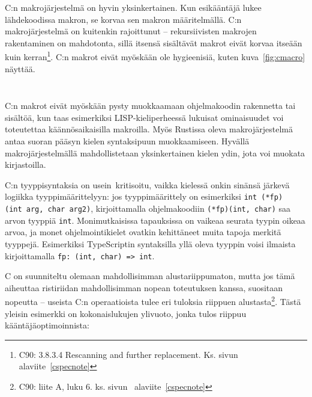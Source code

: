 C:n makrojärjestelmä on hyvin yksinkertainen. Kun esikääntäjä lukee
lähdekoodissa makron, se korvaa sen makron määritelmällä. C:n makrojärjestelmä
on kuitenkin rajoittunut -- rekursiivisten makrojen rakentaminen on mahdotonta,
sillä itsensä sisältävät makrot eivät korvaa itseään kuin kerran\footnote{C90:
3.8.3.4 Rescanning and further replacement. Ks. sivun~\pageref{cspecnote}
alaviite~\ref{cspecnote}}. C:n makrot eivät myöskään ole hygieenisiä, kuten
kuva~\ref{fig:cmacro} näyttää.

\begin{listing}[ht!]
    \inputminted{C}{c-hygiene.c}
    \inputminted{text}{c-hygiene-output.txt}
    \caption{C:n makrot eivät ole hygieenisiä. DOUBLE-makro muuttuu
    käännösvaiheessa muotoon 1+1*2, joka on laskujärjestyksen takia 3 eikä
    odotettu 4. Koko printf-kutsuksi muodostuu siis
    ''\texttt{printf("one plus one doubled is \%d", 1+1*2)}''
    \label{fig:cmacro}
}
\end{listing}

C:n makrot eivät myöskään pysty muokkaamaan ohjelmakoodin rakennetta tai
sisältöä, kun taas esimerkiksi LISP-kieliperheessä lukuisat ominaisuudet voi
toteutettaa käännösaikaisilla makroilla. Myös Rustissa oleva makrojärjestelmä
antaa suoran pääsyn kielen syntaksipuun muokkaamiseen. Hyvällä
makrojärjestelmällä mahdollistetaan yksinkertainen kielen ydin, jota voi
muokata kirjastoilla.

C:n tyyppisyntaksia on usein\citationneeded~kritisoitu, vaikka kielessä onkin
sinänsä järkevä logiikka tyyppimäärittelyyn: jos tyyppimäärittely on
esimerkiksi \texttt{int~(*fp)(int~arg,~char~arg2)}, kirjoittamalla
ohjelmakoodiin \texttt{(*fp)(int,~char)} saa arvon tyyppiä \texttt{int}.
Monimutkaisissa tapauksissa on vaikeaa seurata tyypin oikeaa arvoa, ja monet
ohjelmointikielet ovatkin kehittäneet muita tapoja merkitä tyyppejä.
Esimerkiksi TypeScriptin syntaksilla yllä oleva tyyppin voisi ilmaista
kirjoittamalla \texttt{fp:~(int,~char)~=>~int}.

C on suunniteltu olemaan mahdollisimman alustariippumaton, mutta jos tämä
aiheuttaa ristiriidan mahdollisimman nopean toteutuksen kanssa, suositaan
nopeutta -- useista C:n operaatioista tulee eri tuloksia riippuen
alustasta\footnote{C90: liite A, luku 6. ks. sivun~\pageref{cspecnote}
alaviite~\ref{cspecnote}}. Tästä yleisin esimerkki on kokonaislukujen ylivuoto,
jonka tulos riippuu kääntäjäoptimoinnista:

\FloatBarrier


